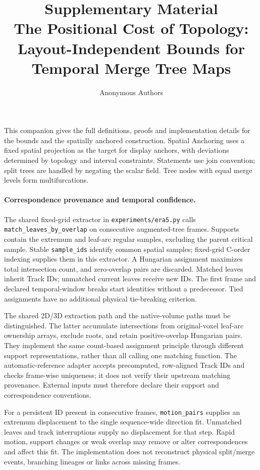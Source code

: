 \documentclass[10pt]{article}
\title{Supplementary Material\\\large The Positional Cost of Topology:\\Layout-Independent Bounds for Temporal Merge Tree Maps}
\author{Anonymous Authors}\date{}
\begin{document}
\maketitle
This companion gives the full definitions, proofs and implementation details for the bounds and the spatially anchored construction. Spatial Anchoring uses a fixed spatial projection as the target for display anchors, with deviations determined by topology and interval constraints. Statements use join convention; split trees are handled by negating the scalar field. Tree nodes with equal merge levels form multifurcations.
\paragraph{Correspondence provenance and temporal confidence.}
The shared fixed-grid extractor in \texttt{experiments/era5.py} calls \texttt{match\_leaves\_by\_overlap} on consecutive augmented-tree frames. Supports contain the extremum and leaf-arc regular samples, excluding the parent critical sample. Stable \texttt{sample\_ids} identify common spatial samples; fixed-grid C-order indexing supplies them in this extractor. A Hungarian assignment maximizes total intersection count, and zero-overlap pairs are discarded. Matched leaves inherit Track IDs; unmatched current leaves receive new IDs. The first frame and declared temporal-window breaks start identities without a predecessor. Tied assignments have no additional physical tie-breaking criterion.

The shared 2D/3D extraction path and the native-volume paths must be distinguished. The latter accumulate intersections from original-voxel leaf-arc ownership arrays, exclude roots, and retain positive-overlap Hungarian pairs. They implement the same count-based assignment principle through different support representations, rather than all calling one matching function. The automatic-reference adapter accepts precomputed, row-aligned Track IDs and checks frame-wise uniqueness; it does not verify their upstream matching provenance. External inputs must therefore declare their support and correspondence conventions.

For a persistent ID present in consecutive frames, \texttt{motion\_pairs} supplies an extremum displacement to the single sequence-wide direction fit. Unmatched leaves and track interruptions supply no displacement for that step. Rapid motion, support changes or weak overlap may remove or alter correspondences and affect this fit. The implementation does not reconstruct physical split/merge events, branching lineages or links across missing frames.
\end{document}
